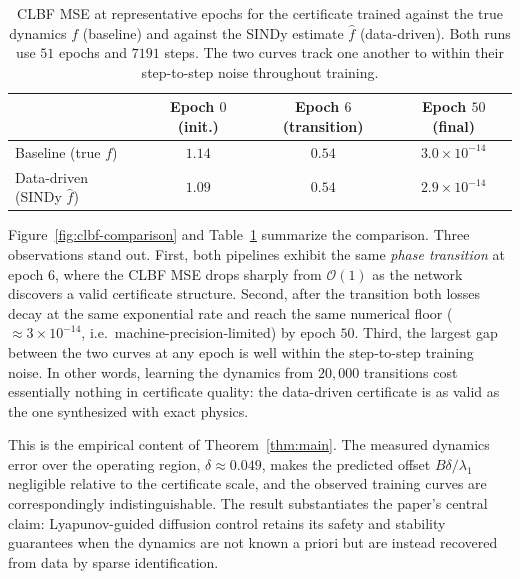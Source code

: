 \documentclass{article}
\newcommand{\hf}{\hat{f}}
\begin{document}
\begin{table}[t]
    \centering
    \caption{CLBF MSE at representative epochs for the certificate trained against
    the true dynamics $f$ (baseline) and against the SINDy estimate $\hf$
    (data-driven). Both runs use $51$ epochs and $7191$ steps. The two curves
    track one another to within their step-to-step noise throughout training.}
    \label{tab:clbf-comparison}
    \begin{tabular}{lccc}
        \toprule
        & Epoch $0$ (init.) & Epoch $6$ (transition) & Epoch $50$ (final) \\
        \midrule
        Baseline (true $f$)        & $1.14$ & $0.54$ & $3.0\times10^{-14}$ \\
        Data-driven (SINDy $\hf$)  & $1.09$ & $0.54$ & $2.9\times10^{-14}$ \\
        \bottomrule
    \end{tabular}
\end{table}

Figure~\ref{fig:clbf-comparison} and Table~\ref{tab:clbf-comparison} summarize the
comparison. Three observations stand out. First, both pipelines exhibit the same
\emph{phase transition} at epoch $6$, where the CLBF MSE drops sharply from
$\mathcal{O}(1)$ as the network discovers a valid certificate structure. Second,
after the transition both losses decay at the same exponential rate and reach the
same numerical floor ($\approx 3\times10^{-14}$, i.e.\ machine-precision-limited)
by epoch $50$. Third, the largest gap between the two curves at any epoch is well
within the step-to-step training noise. In other words, learning the dynamics from
$20{,}000$ transitions cost essentially nothing in certificate quality: the
data-driven certificate is as valid as the one synthesized with exact physics.

This is the empirical content of Theorem~\ref{thm:main}. The measured dynamics
error over the operating region, $\delta\approx 0.049$, makes the predicted offset
$B\delta/\lambda_1$ negligible relative to the certificate scale, and the observed
training curves are correspondingly indistinguishable. The result substantiates
the paper's central claim: Lyapunov-guided diffusion control retains its safety
and stability guarantees when the dynamics are not known a priori but are instead
recovered from data by sparse identification.

\newpage



\end{document}

